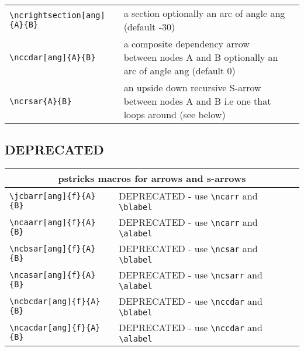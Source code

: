 \documentclass[10pt,a4paper]{article}
\begin{document}
\begin{tabular}{|l |  p{5cm} | c |}
      &
      \raisebox{-0.6cm}{$
\begin{array} {c}
\Rnode{B}{B} \\ [1.0cm]
\Rnode{A}{A}
\end{array}$\ncsar{B}{A}\ncleftsection{A}{B}} \\
       \hline  
%  
       \verb!\ncrightsection[ang]{A}{B}! &  a section optionally an arc of angle ang (default -30)
      &
      \raisebox{-0.6cm}{$
\begin{array} {c}
\Rnode{B}{B} \\ [1.0cm]
\Rnode{A}{A}
\end{array}$\ncsar{B}{A}\ncrightsection{A}{B}} \\
       \hline  
%
		   \verb!\nccdar[ang]{A}{B}! &  a composite dependency arrow between nodes A and B optionally an arc of angle ang (default 0)
			&
			\raisebox{-0.75cm}{$
\begin{array} {c}
\Rnode{A}{A} \\ [0.75cm]
\Rnode{B}{B}
\end{array}$\nccdar{A}{B}} \\
		 	 \hline
%   
		   \verb!\ncrsar{A}{B}! &  an upside down recursive S-arrow between nodes A and B i.e one that loops around (see below)
			&
			\\ 
			\hline		
\end{tabular}

\newpage
\subsection{DEPRECATED}
\begin{tabular}{|l |  p{5cm} | c |}
    \hline
    \multicolumn{3}{|c|}{pstricks macros for arrows and s-arrows} \\
       \hline  
       \verb!\jcbarr[ang]{f}{A}{B}! & DEPRECATED - use \verb'\ncarr' and \verb'\blabel'&\\
       \hline
       \verb!\ncaarr[ang]{f}{A}{B}! & DEPRECATED - use \verb'\ncarr' and \verb'\alabel'&\\
       \hline     
       \verb!\ncbsar[ang]{f}{A}{B}! & DEPRECATED - use \verb'\ncsar' and \verb'\blabel'&\\ 
       \hline
       \verb!\ncasar[ang]{f}{A}{B}! & DEPRECATED - use \verb'\ncsarr' and \verb'\alabel'&\\
       \hline   
       \verb!\ncbcdar[ang]{f}{A}{B}! & DEPRECATED - use \verb'\nccdar' and \verb'\blabel'&\\
       \hline      
       \verb!\ncacdar[ang]{f}{A}{B}! & DEPRECATED - use \verb'\nccdar' and \verb'\alabel'&\\
       \hline       
\end{tabular}
\end{document}
